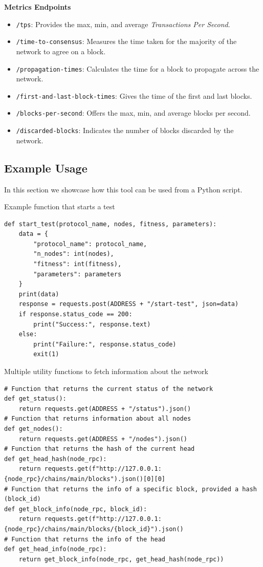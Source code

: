 \textbf{Metrics Endpoints}
\begin{itemize}
  \item \texttt{/tps}: Provides the max, min, and average \textit{Transactions Per Second}.
  \item \texttt{/time-to-consensus}: Measures the time taken for the majority of the network to agree on a block.
  \item \texttt{/propagation-times}: Calculates the time for a block to propagate across the network.
  \item \texttt{/first-and-last-block-times}: Gives the time of the first and last blocks.
  \item \texttt{/blocks-per-second}: Offers the max, min, and average blocks per second.
  \item \texttt{/discarded-blocks}: Indicates the number of blocks discarded by the network.
\end{itemize}


\subsection*{Example Usage}

In this section we showcase how this tool can be used from a Python script.

\begin{listing}[H]
\caption{Example function that starts a test}
\label{lst:python_code}
\begin{verbatim}
def start_test(protocol_name, nodes, fitness, parameters):
    data = {
        "protocol_name": protocol_name,
        "n_nodes": int(nodes),
        "fitness": int(fitness),
        "parameters": parameters
    }
    print(data)
    response = requests.post(ADDRESS + "/start-test", json=data)
    if response.status_code == 200:
        print("Success:", response.text)
    else:
        print("Failure:", response.status_code)
        exit(1)
\end{verbatim}
\end{listing}

\begin{listing}[H]
\caption{Multiple utility functions to fetch information about the network}
\label{lst:python_code}
\begin{verbatim}
# Function that returns the current status of the network
def get_status():
    return requests.get(ADDRESS + "/status").json()
# Function that returns information about all nodes
def get_nodes():
    return requests.get(ADDRESS + "/nodes").json()
# Function that returns the hash of the current head
def get_head_hash(node_rpc):
    return requests.get(f"http://127.0.0.1:{node_rpc}/chains/main/blocks").json()[0][0]
# Function that returns the info of a specific block, provided a hash (block_id)
def get_block_info(node_rpc, block_id):
    return requests.get(f"http://127.0.0.1:{node_rpc}/chains/main/blocks/{block_id}").json()
# Function that returns the info of the head
def get_head_info(node_rpc):
    return get_block_info(node_rpc, get_head_hash(node_rpc))
\end{verbatim}
\end{listing}




